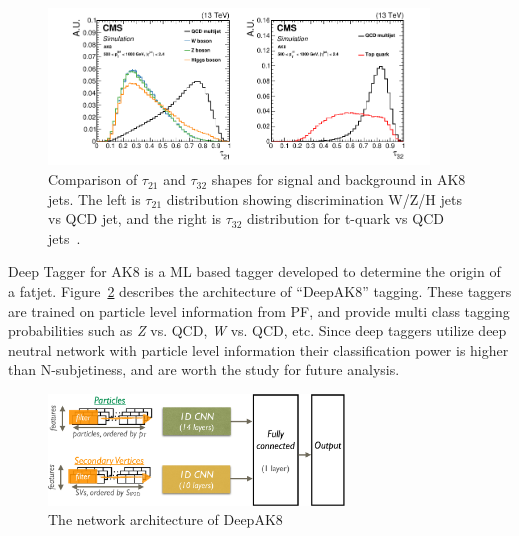 \begin{figure}[!ht]
  \centering
  \includegraphics[width=0.9\textwidth]{figures/CMS_JME_18_002_Figure_003.pdf}
  \caption[Comparison of \( \tau_{21} \) and \( \tau_{32} \) shapes for signal and background in AK8 jets]%
  {Comparison of \( \tau_{21} \) and \( \tau_{32} \) shapes for signal and background in AK8 jets.
    The left is \( \tau_{21} \) distribution showing discrimination W/Z/H jets
    vs QCD jet, and the right is \( \tau_{32} \) distribution for t-quark vs
    QCD jets~\cite{cms-jme-deep-tagger}.}%
  \label{fig:cms-tau21-tau32-comparison}
\end{figure}

Deep Tagger for AK8 is a \gls{ML} based tagger developed to determine the
origin of a fatjet. Figure~\ref{fig:cms-deepAK8-arch}
describes the architecture of ``DeepAK8'' tagging. These taggers are trained on particle level information
from \gls{PF}, and provide multi class tagging probabilities such as
\textit{Z} vs. \gls{QCD}, \textit{W} vs. \gls{QCD}, etc.
Since deep taggers utilize deep neutral network with particle level
information their classification power is higher than N-subjetiness,
and are worth the study for future analysis.

\begin{figure}[!ht]
  \centering
  \includegraphics[width=0.7\textwidth]{figures/CMS_JME_18_002_Figure_009.pdf}
  \caption[The network architecture of DeepAK8]%
  {The network architecture of DeepAK8~\cite{cms-jme-deep-tagger}}%
  \label{fig:cms-deepAK8-arch}
\end{figure}

